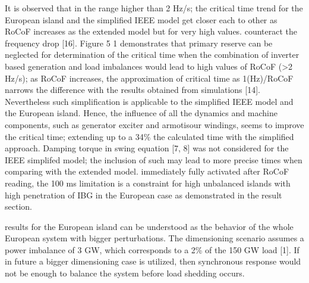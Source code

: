 It is observed that in the range higher than 2 Hz/s; the critical time trend for the European island and the  simplified IEEE model get closer each to other as RoCoF increases
as the extended model but for very high values. %
counteract the frequency drop [16]. Figure 5 1 demonstrates that primary reserve can be neglected for determination of the critical time when the combination of inverter based generation and
load imbalances would lead to high values of RoCoF (>2 Hz/s); as RoCoF increases, the approximation of critical time as 1(Hz)/RoCoF narrows the difference with the results obtained from simulations [14].
 Nevertheless such simplification is applicable to the simplified IEEE model and the European island. Hence, the influence of all the dynamics and machine components, such as
generator exciter and armotisour windings, seems to improve the critical time; extending up to a 34\% the calculated time with the simplified approach. Damping torque in swing equation [7, 8] was
not considered for the IEEE simplifed model; the inclusion of such may lead to more precise times when comparing with the extended model.
immediately fully activated after RoCoF reading, the 100 ms limitation is a constraint for high unbalanced islands with high penetration of IBG in the European case as
demonstrated in the result section. 


results for the European island can be understood as the behavior of the whole European system with bigger perturbations. The dimensioning scenario assumes a power imbalance
of 3 GW, which corresponds to a 2\% of the 150 GW load [1]. If in future a bigger dimensioning case is utilized, then synchronous response would not be enough to balance the system before load shedding occurs.

